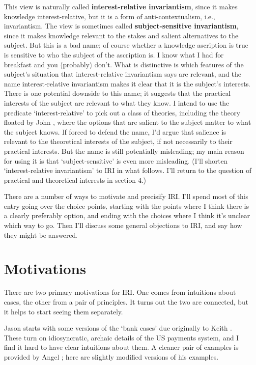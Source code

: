 \documentclass[11pt,oneside]{book}
\begin{document}
This view is naturally called \textbf{interest-relative invariantism}, since it makes knowledge interest-relative, but it is a form of anti-contextualism, i.e., invariantism. The view is sometimes called \textbf{subject-sensitive invariantism}, since it makes knowledge relevant to the stakes and salient alternatives to the subject. But this is a bad name; of course whether a knowledge ascription is true is sensitive to who the subject of the ascription is. I know what I had for breakfast and you (probably) don't. What is distinctive is which features of the subject's situation that interest-relative invariantism says are relevant, and the name interest-relative invariantism makes it clear that it is the subject's interests. There is one potential downside to this name; it suggests that the practical interests of the subject are relevant to what they know. I intend to use the predicate `interest-relative' to pick out a class of theories, including the theory floated by John  \citet{Hawthorne2004}, where the options that are salient to the subject matter to what the subject knows. If forced to defend the name, I'd argue that salience is relevant to the theoretical interests of the subject, if not necessarily to their practical interests. But the name is still potentially misleading; my main reason for using it is that `subject-sensitive' is even more misleading. (I'll shorten `interest-relative invariantism' to IRI in what follows. I'll return to the question of practical and theoretical interests in section 4.)

There are a number of ways to motivate and precisify IRI. I'll spend most of this entry going over the choice points, starting with the points where I think there is a clearly preferably option, and ending with the choices where I think it's unclear which way to go. Then I'll discuss some general objections to IRI, and say how they might be answered.

\section{Motivations}
\label{motivations}

There are two primary motivations for IRI. One comes from intuitions about cases, the other from a pair of principles. It turns out the two are connected, but it helps to start seeing them separately.

Jason  \citet{Stanley2005} starts with some versions of the `bank cases' due originally to Keith  \citet{DeRose1992}. These turn on idiosyncratic, archaic details of the US payments system, and I find it hard to have clear intuitions about them. A cleaner pair of examples is provided by Angel  \citet{Pinillos2012}; here are slightly modified versions of his examples.
\end{document}
